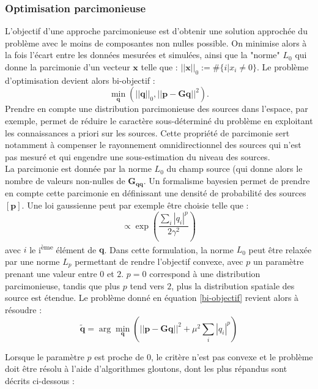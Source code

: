 \subsubsection{Optimisation parcimonieuse }
L'objectif d'une approche parcimonieuse est d'obtenir une solution approchée du problème avec le moins de composantes non nulles possible. On minimise alors à la fois l'écart entre les données mesurées et simulées, ainsi que la "norme" $L_0$ qui donne la parcimonie d'un vecteur $\bm{x}$ telle que : $||\bm{x}||_0 := \#\{i|x_i\neq0\}$. Le problème d'optimisation devient alors bi-objectif : 
\begin{equation}
	\min_{\bm{q}}(||\bm{q}||_0 , ||\bm{p}-\bm{G}\bm{q}||^2) .
	\label{bi-objectif}
\end{equation}
Prendre en compte une distribution parcimonieuse des sources dans l'espace, par exemple, permet de réduire le caractère sous-déterminé du problème en exploitant les connaissances a priori sur les sources. Cette propriété de parcimonie sert notamment à compenser le rayonnement omnidirectionnel des sources qui n'est pas mesuré et qui engendre une sous-estimation du niveau des sources. \\
La parcimonie est donnée par la norme $L_0$ du champ source (qui donne alors le nombre de valeurs non-nulles de $\bm{G_{qq}}$. Un formalisme bayesien permet de prendre en compte cette parcimonie en définissant une densité de probabilité des sources $[\bm{p}]$. Une loi gaussienne peut par exemple être choisie telle que : 
\begin{equation}
 [\bm{p}] \propto \exp\left(\frac{\sum_i |q_i|^p}{2\gamma^2}\right)
\end{equation}
avec $i$ le i\textsuperscript{ème} élément de $\bm{q}$. Dans cette formulation, la norme $L_0$ peut être relaxée par une norme $L_p$ permettant de rendre l'objectif convexe, avec $p$ un paramètre prenant une valeur entre $0$ et $2$. $p=0$ correspond à une distribution parcimonieuse, tandis que plus $p$ tend vers $2$, plus la distribution spatiale des source est étendue. Le problème donné en équation \ref{bi-objectif} revient alors à résoudre :
\begin{equation}
	\bm{\tilde{q}}=\arg\min_{\bm{q}}\left( ||\bm{p}-\bm{G}\bm{q}||^2 + \mu^2\sum_i |q_i|^p \right)
\end{equation}


Lorsque le paramètre $p$ est proche de 0, le critère n'est pas convexe et le problème doit être résolu à l'aide d'algorithmes gloutons, dont les plus répandus sont décrits ci-dessous : 
